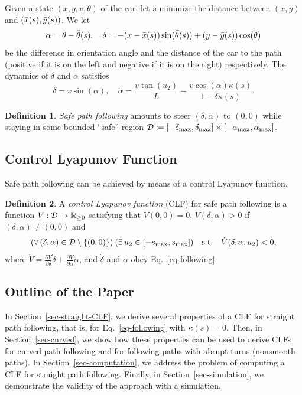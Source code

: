 \documentclass{article}
\theoremstyle{plain}
\theoremstyle{definition}
\newtheorem{definition}{Definition}
\theoremstyle{remark}
\newcommand{\smax}{s_\maxtxt}
\newcommand{\deltamax}{\delta_\maxtxt}
\newcommand{\alphamax}{\alpha_\maxtxt}
\begin{document}
Given a state $(x,y,v,\theta)$ of the car, let $s$
minimize the distance between $(x,y)$ and $(\bar{x}(s),\bar{y}(s))$.
We let
\[
\alpha=\theta-\bar{\theta}(s), \quad \delta=-(x-\bar{x}(s))\sin(\bar{\theta}(s))+(y-\bar{y}(s))\cos(\theta)
\]
be the difference in orientation angle and the distance
of the car to the path (positive if it is on the left and negative if it is on the right) respectively.
The dynamics of $\delta$ and $\alpha$ satisfies
\begin{equation}\label{eq-following}
\dot\delta = v\sin(\alpha), \quad \dot\alpha = \frac{v\tan(u_2)}L - \frac{v\cos(\alpha)\kappa(s)}{1-\delta\kappa(s)}.
\end{equation}

\begin{definition}
\emph{Safe path following} amounts to steer $(\delta,\alpha)$ to $(0,0)$
while staying in some bounded ``safe'' region $\calD\coloneqq[-\deltamax,\deltamax]\times[-\alphamax,\alphamax]$.
\end{definition}

\subsection{Control Lyapunov Function}

Safe path following can be achieved by means of a control Lyapunov function.

\begin{definition}
A \emph{control Lyapunov function} (CLF) for safe path following is a function $V:\mathcal{D}\to\mathbb{R}_{\geq0}$
satisfying that $V(0,0)=0$, $V(\delta,\alpha)>0$ if $(\delta,\alpha)\neq(0,0)$ and
\begin{equation}\label{eq-lie-clf}
(\forall\,(\delta,\alpha)\in\calD\setminus\{(0,0)\})\:(\exists\,u_2\in[-\smax,\smax])
\quad\text{s.t.}\quad \dot{V}(\delta,\alpha,u_2) < 0,
\end{equation}
where
$\dot{V}=\frac{\partial V}{\partial\delta}\dot\delta+\frac{\partial V}{\partial\alpha}\dot\alpha$,
and $\dot\delta$ and $\dot\alpha$ obey Eq.~\eqref{eq-following}.
\end{definition}

\subsection{Outline of the Paper}

In Section~\ref{sec-straight-CLF}, we derive several properties of a CLF for straight path following,
that is, for Eq.~\eqref{eq-following} with $\kappa(s)=0$.
Then, in Section~\ref{sec-curved}, we show how these properties can be used to derive
CLFs for curved path following and for following paths with abrupt turns (nonsmooth paths).
In Section~\ref{sec-computation}, we address the problem of computing a CLF for straight path following.
Finally, in Section~\ref{sec-simulation}, we demonstrate the validity of the approach with a simulation.
\end{document}
